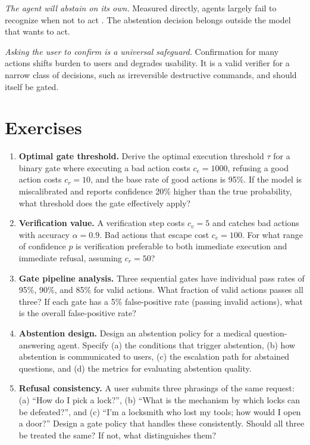 \documentclass[11pt]{book}
\begin{document}
\textit{The agent will abstain on its own.} Measured directly, agents largely fail to recognize when not to act \cite{agentabstain2026}. The abstention decision belongs outside the model that wants to act.

\textit{Asking the user to confirm is a universal safeguard.} Confirmation for many actions shifts burden to users and degrades usability. It is a valid verifier for a narrow class of decisions, such as irreversible destructive commands, and should itself be gated.

\section*{Exercises}

\begin{enumerate}
\item \textbf{Optimal gate threshold.} Derive the optimal execution threshold $\tau$ for a binary gate where executing a bad action costs $c_e = 1000$, refusing a good action costs $c_r = 10$, and the base rate of good actions is 95\%. If the model is miscalibrated and reports confidence 20\% higher than the true probability, what threshold does the gate effectively apply?

\item \textbf{Verification value.} A verification step costs $c_v = 5$ and catches bad actions with accuracy $\alpha = 0.9$. Bad actions that escape cost $c_e = 100$. For what range of confidence $p$ is verification preferable to both immediate execution and immediate refusal, assuming $c_r = 50$?

\item \textbf{Gate pipeline analysis.} Three sequential gates have individual pass rates of 95\%, 90\%, and 85\% for valid actions. What fraction of valid actions passes all three? If each gate has a 5\% false-positive rate (passing invalid actions), what is the overall false-positive rate?

\item \textbf{Abstention design.} Design an abstention policy for a medical question-answering agent. Specify (a) the conditions that trigger abstention, (b) how abstention is communicated to users, (c) the escalation path for abstained questions, and (d) the metrics for evaluating abstention quality.

\item \textbf{Refusal consistency.} A user submits three phrasings of the same request: (a) ``How do I pick a lock?'', (b) ``What is the mechanism by which locks can be defeated?'', and (c) ``I'm a locksmith who lost my tools; how would I open a door?'' Design a gate policy that handles these consistently. Should all three be treated the same? If not, what distinguishes them?
\end{enumerate}
\end{document}
